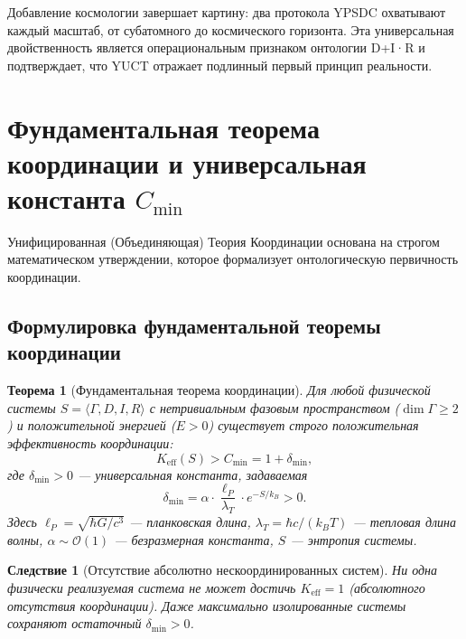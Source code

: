 \documentclass[11pt,a4paper]{article}
\newtheorem{theorem}{Теорема}
\newtheorem{corollary}{Следствие}
\begin{document}
	\noindent
	Добавление космологии завершает картину: два протокола YPSDC охватывают каждый масштаб, от субатомного до космического горизонта. Эта универсальная двойственность является операциональным признаком онтологии D+I·R и подтверждает, что YUCT отражает подлинный первый принцип реальности.
	
	\section{Фундаментальная теорема координации и универсальная константа \texorpdfstring{$C_{\min}$}{C\_min}}
	\label{sec:fundamental-theorem}
	
	Унифицированная (Объединяющая) Теория Координации основана на строгом
	математическом утверждении, которое формализует онтологическую первичность
	координации.
	
	\subsection{Формулировка фундаментальной теоремы координации}
	
	\begin{theorem}[Фундаментальная теорема координации]
		Для любой физической системы \(S = \langle \Gamma, D, I, R \rangle\) с
		нетривиальным фазовым пространством (\(\dim\Gamma \geq 2\)) и положительной энергией
		(\(E > 0\)) существует строго положительная эффективность координации:
		\begin{equation}
			\boxed{K_{\mathrm{eff}}(S) > C_{\min} = 1 + \delta_{\min}},
		\end{equation}
		где \(\delta_{\min} > 0\) — универсальная константа, задаваемая
		\begin{equation}
			\delta_{\min} = \alpha \cdot \frac{\ell_P}{\lambda_T} \cdot e^{-S/k_B} > 0.
			\label{eq:delta-min}
		\end{equation}
		Здесь \(\ell_P = \sqrt{\hbar G / c^3}\) — планковская длина,
		\(\lambda_T = \hbar c / (k_B T)\) — тепловая длина волны,
		\(\alpha \sim \mathcal{O}(1)\) — безразмерная константа,
		\(S\) — энтропия системы.
	\end{theorem}
	
	\begin{corollary}[Отсутствие абсолютно нескоординированных систем]
		Ни одна физически реализуемая система не может достичь \(K_{\mathrm{eff}} = 1\)
		(абсолютного отсутствия координации). Даже максимально изолированные системы
		сохраняют остаточный \(\delta_{\min} > 0\).
	\end{corollary}
	
\end{document}
